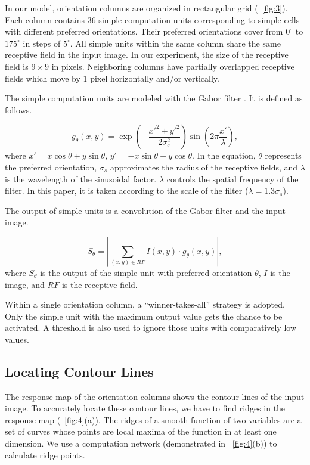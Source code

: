 \documentclass[10pt,letterpaper]{article}
\begin{document}
In our model, orientation columns are organized in rectangular grid
(\figurename~\ref{fig:3}).
Each column contains 36 simple computation units corresponding to 
simple cells with different preferred orientations.
Their preferred orientations cover from $0^\circ$ to $175^\circ$ in steps of $5^\circ$.
All simple units within the same column share the same receptive field in the input image.
In our experiment, the size of the receptive field is $9\times 9$ in pixels.
Neighboring columns have partially overlapped receptive fields
which move by $1$ pixel horizontally and/or vertically.

The simple computation units are modeled with the Gabor filter \cite{gabor1946}.
It is defined as follows.

\begin{equation}\label{equ:1}
g_{\theta}(x,y)
=\exp \left(-\frac{x'^2+y'^2}{2\sigma_s^2}\right)
\sin \left(2\pi\frac{x'}{\lambda}\right),
\end{equation}
where $x'=x\cos\theta+y\sin\theta$, $y'=-x\sin\theta+y\cos\theta$.
In the equation, $\theta$ represents the preferred orientation,
$\sigma_s$ approximates the radius of the receptive fields,
and $\lambda$ is the wavelength of the sinusoidal factor.
$\lambda$ controls the spatial frequency of the filter.
In this paper, it is taken according to the scale of the filter
($\lambda=1.3\sigma_s$).

The output of simple units is a convolution of the Gabor filter and the input image.

\begin{equation}\label{equ:2}
S_{\theta}=\left|\sum_{(x,y)\in RF}I(x,y)\cdot g_{\theta}(x,y)\right|,
\end{equation}
where $S_{\theta}$ is the output of the simple unit with preferred orientation $\theta$,
$I$ is the image, and $RF$ is the receptive field.

Within a single orientation column, a ``winner-takes-all'' strategy is adopted.
Only the simple unit with the maximum output value gets the chance to be activated.
A threshold is also used to ignore those units with comparatively low values.

\subsection{Locating Contour Lines}

The response map of the orientation columns shows the contour lines of the input image.
To accurately locate these contour lines, we have to find ridges in the response map
(\figurename~\ref{fig:4}(a)).
The ridges of a smooth function of two variables are a set of curves 
whose points are local maxima of the function in at least one dimension.
We use a computation network (demonstrated in \figurename~\ref{fig:4}(b)) to calculate ridge points.
\end{document}
